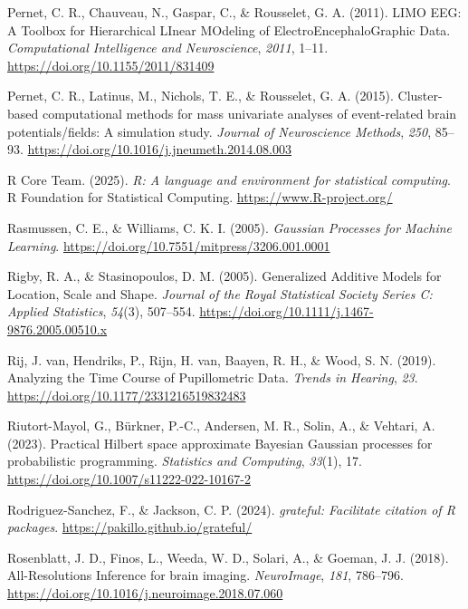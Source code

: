 \documentclass[
  doc,
  floatsintext,
  longtable,
  a4paper,
  nolmodern,
  notxfonts,
  notimes,
  colorlinks=true,linkcolor=blue,citecolor=blue,urlcolor=blue]{apa7}
\newlength{\cslhangindent}
\newenvironment{CSLReferences}[2] %
 {\begin{list}{}{%
  \setlength{\itemindent}{0pt}
  \setlength{\leftmargin}{0pt}
  \setlength{\parsep}{0pt}
  \ifodd #1
   \setlength{\leftmargin}{\cslhangindent}
   \setlength{\itemindent}{-1\cslhangindent}
  \fi
  \setlength{\itemsep}{#2\baselineskip}}}
 {\end{list}}
\begin{document}
\begin{CSLReferences}{1}{0}
Pernet, C. R., Chauveau, N., Gaspar, C., \& Rousselet, G. A. (2011).
LIMO EEG: A Toolbox for Hierarchical LInear MOdeling of
ElectroEncephaloGraphic Data. \emph{Computational Intelligence and
Neuroscience}, \emph{2011}, 1--11.
\url{https://doi.org/10.1155/2011/831409}

Pernet, C. R., Latinus, M., Nichols, T. E., \& Rousselet, G. A. (2015).
Cluster-based computational methods for mass univariate analyses of
event-related brain potentials/fields: A simulation study. \emph{Journal
of Neuroscience Methods}, \emph{250}, 85--93.
\url{https://doi.org/10.1016/j.jneumeth.2014.08.003}

R Core Team. (2025). \emph{{R}: A language and environment for
statistical computing}. R Foundation for Statistical Computing.
\url{https://www.R-project.org/}

Rasmussen, C. E., \& Williams, C. K. I. (2005). \emph{Gaussian Processes
for Machine Learning}.
\url{https://doi.org/10.7551/mitpress/3206.001.0001}

Rigby, R. A., \& Stasinopoulos, D. M. (2005). Generalized Additive
Models for Location, Scale and Shape. \emph{Journal of the Royal
Statistical Society Series C: Applied Statistics}, \emph{54}(3),
507--554. \url{https://doi.org/10.1111/j.1467-9876.2005.00510.x}

Rij, J. van, Hendriks, P., Rijn, H. van, Baayen, R. H., \& Wood, S. N.
(2019). Analyzing the Time Course of Pupillometric Data. \emph{Trends in
Hearing}, \emph{23}. \url{https://doi.org/10.1177/2331216519832483}

Riutort-Mayol, G., Bürkner, P.-C., Andersen, M. R., Solin, A., \&
Vehtari, A. (2023). Practical {Hilbert} space approximate {Bayesian
Gaussian} processes for probabilistic programming. \emph{Statistics and
Computing}, \emph{33}(1), 17.
\url{https://doi.org/10.1007/s11222-022-10167-2}

Rodriguez-Sanchez, F., \& Jackson, C. P. (2024). \emph{{grateful}:
Facilitate citation of {R} packages}.
\url{https://pakillo.github.io/grateful/}

Rosenblatt, J. D., Finos, L., Weeda, W. D., Solari, A., \& Goeman, J. J.
(2018). All-Resolutions Inference for brain imaging. \emph{NeuroImage},
\emph{181}, 786--796.
\url{https://doi.org/10.1016/j.neuroimage.2018.07.060}


\end{CSLReferences}
\end{document}

